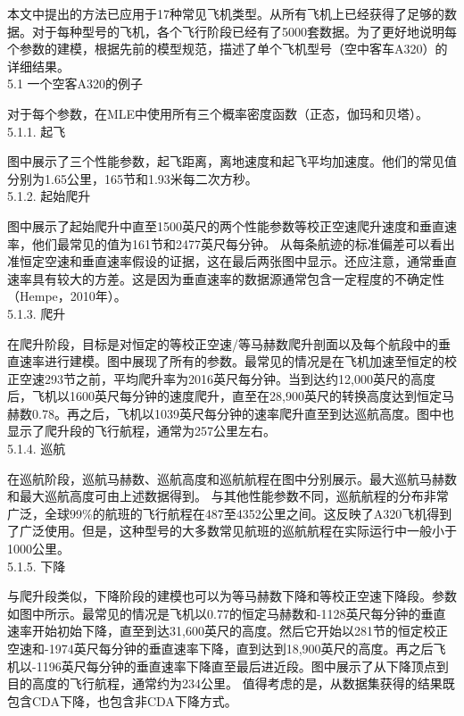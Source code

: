 \documentclass[a4paper,punct,space,heading=true,AutoFakeBold]{ctexrep}
\begin{document}
本文中提出的方法已应用于17种常见飞机类型。从所有飞机上已经获得了足够的数据。对于每种型号的飞机，各个飞行阶段已经有了5000套数据。为了更好地说明每个参数的建模，根据先前的模型规范，描述了单个飞机型号（空中客车A320）的详细结果。\\
5.1 一个空客A320的例子

对于每个参数，在MLE中使用所有三个概率密度函数（正态，伽玛和贝塔）。\\
5.1.1. 起飞

图中展示了三个性能参数，起飞距离，离地速度和起飞平均加速度。他们的常见值分别为1.65公里，165节和1.93米每二次方秒。\\
5.1.2. 起始爬升

图中展示了起始爬升中直至1500英尺的两个性能参数等校正空速爬升速度和垂直速率，他们最常见的值为161节和2477英尺每分钟。
从每条航迹的标准偏差可以看出准恒定空速和垂直速率假设的证据，这在最后两张图中显示。还应注意，通常垂直速率具有较大的方差。这是因为垂直速率的数据源通常包含一定程度的不确定性（Hempe，2010年）。\\
5.1.3. 爬升

在爬升阶段，目标是对恒定的等校正空速/等马赫数爬升剖面以及每个航段中的垂直速率进行建模。图中展现了所有的参数。最常见的情况是在飞机加速至恒定的校正空速293节之前，平均爬升率为2016英尺每分钟。当到达约12,000英尺的高度后，飞机以1600英尺每分钟的速度爬升，直至在28,900英尺的转换高度达到恒定马赫数0.78。再之后，飞机以1039英尺每分钟的速率爬升直至到达巡航高度。图中也显示了爬升段的飞行航程，通常为257公里左右。\\
5.1.4. 巡航

在巡航阶段，巡航马赫数、巡航高度和巡航航程在图中分别展示。最大巡航马赫数和最大巡航高度可由上述数据得到。
与其他性能参数不同，巡航航程的分布非常广泛，全球99\%的航班的飞行航程在487至4352公里之间。这反映了A320飞机得到了广泛使用。但是，这种型号的大多数常见航班的巡航航程在实际运行中一般小于1000公里。\\
5.1.5. 下降

与爬升段类似，下降阶段的建模也可以为等马赫数下降和等校正空速下降段。参数如图中所示。最常见的情况是飞机以0.77的恒定马赫数和-1128英尺每分钟的垂直速率开始初始下降，直至到达31,600英尺的高度。然后它开始以281节的恒定校正空速和-1974英尺每分钟的垂直速率下降，直到达到18,900英尺的高度。再之后飞机以-1196英尺每分钟的垂直速率下降直至最后进近段。图中展示了从下降顶点到目的高度的飞行航程，通常约为234公里。
值得考虑的是，从数据集获得的结果既包含CDA下降，也包含非CDA下降方式。


	
%
\end{document}
